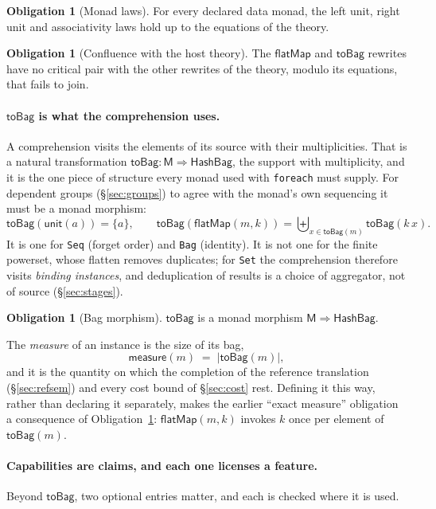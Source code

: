 \documentclass[11pt]{article}
\theoremstyle{definition}
\newtheorem{obligation}[definition]{Obligation}
\theoremstyle{plain}
\theoremstyle{remark}
\newcommand{\M}{\mathsf{M}}
\newcommand{\unit}{\mathsf{unit}}
\newcommand{\bind}{\mathsf{flatMap}}
\newcommand{\meas}{\mathsf{measure}}
\newcommand{\fe}{\texttt{foreach}}
\begin{document}
\begin{obligation}[Monad laws]
For every declared data monad, the left unit, right unit and associativity
laws hold up to the equations of the theory.
\end{obligation}

\begin{obligation}[Confluence with the host theory]
\label{obl:confluence}
The \(\bind\) and \(\mathsf{toBag}\) rewrites have no critical pair with the
other rewrites of the theory, modulo its equations, that fails to join.
\end{obligation}

\paragraph{\(\mathsf{toBag}\) is what the comprehension uses.} A comprehension
visits the elements of its source with their multiplicities. That is a natural
transformation \(\mathsf{toBag} : \M \Rightarrow \mathsf{HashBag}\), the
support with multiplicity, and it is the one piece of structure every monad
used with \fe{} must supply. For dependent groups (\S\ref{sec:groups}) to agree
with the monad's own sequencing it must be a monad morphism:
\[
\mathsf{toBag}(\unit(a)) = \{a\},
\qquad
\mathsf{toBag}(\bind(m, k)) = \textstyle\biguplus_{x \in \mathsf{toBag}(m)} \mathsf{toBag}(k\,x).
\]
It is one for \texttt{Seq} (forget order) and \texttt{Bag} (identity). It is
not one for the finite powerset, whose flatten removes duplicates; for
\texttt{Set} the comprehension therefore visits \emph{binding instances}, and
deduplication of results is a choice of aggregator, not of source
(\S\ref{sec:stages}).

\begin{obligation}[Bag morphism]
\label{obl:tobag}
\(\mathsf{toBag}\) is a monad morphism \(\M\Rightarrow\mathsf{HashBag}\).
\end{obligation}

The \emph{measure} of an instance is the size of its bag,
\[
\meas(m) \;=\; |\mathsf{toBag}(m)|,
\]
and it is the quantity on which the completion of the reference translation
(\S\ref{sec:refsem}) and every cost bound of \S\ref{sec:cost} rest. Defining it
this way, rather than declaring it separately, makes the earlier ``exact
measure'' obligation a consequence of Obligation~\ref{obl:tobag}: \(\bind(m,
k)\) invokes \(k\) once per element of \(\mathsf{toBag}(m)\).

\paragraph{Capabilities are claims, and each one licenses a feature.} Beyond
\(\mathsf{toBag}\), two optional entries matter, and each is checked where it is
used.
\end{document}
